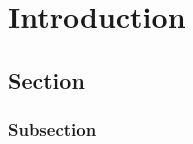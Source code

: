\chapter{Introduction}
\Blindtext[5]
\section{Section}
\Blindtext[10]
\subsection{Subsection}
\Blindtext[10]
